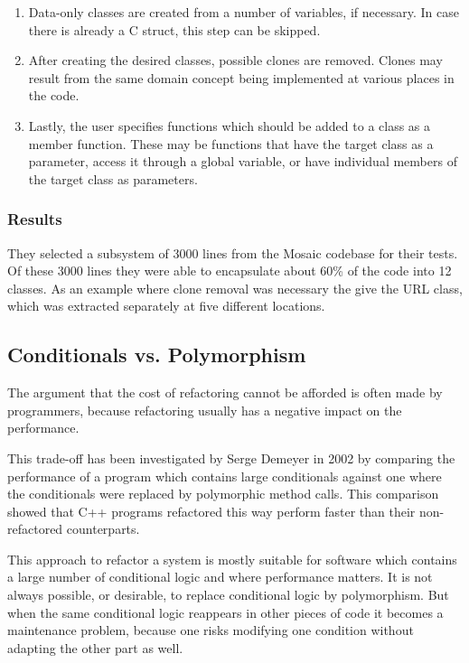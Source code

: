 \documentclass[conference,compsoc,a4paper]{IEEEtran}
\newcommand{\code}[1]{{\small\ttfamily #1}}
\begin{document}
\begin{enumerate}
  \item Data-only classes are created from a number of variables, if necessary. In case there is already a C 
  \code{struct}, this step can be skipped.
  
  \item After creating the desired classes, possible clones are removed. Clones may result from the same domain concept 
  being implemented at various places in the code.
  
  \item Lastly, the user specifies functions which should be added to a class as a member function. These may be 
  functions that have the target class as a parameter, access it through a global variable, or have individual members 
  of the target class as parameters.
\end{enumerate}

\subsubsection{Results}

They selected a subsystem of 3000 lines from the Mosaic codebase for their tests. Of these 3000 lines they were able to 
encapsulate about 60\% of the code into 12 classes. As an example where clone removal was necessary the give the URL 
class, which was extracted separately at five different locations.

\subsection{Conditionals vs. Polymorphism} \label{sec:polymorphism}

The argument that the cost of refactoring cannot be afforded is often made by programmers, because refactoring usually 
has a negative impact on the performance.

This trade-off has been investigated by Serge Demeyer in 2002 \cite{polymorphism} by comparing the performance of a 
program which contains large conditionals against one where the conditionals were replaced by polymorphic method calls. 
This comparison showed that C++ programs refactored this way perform faster than their non-refactored counterparts.

This approach to refactor a system is mostly suitable for software which contains a large number of conditional logic 
and where performance matters. It is not always possible, or desirable, to replace conditional logic by polymorphism. 
But when the same conditional logic reappears in other pieces of code it becomes a maintenance problem, because one 
risks modifying one condition without adapting the other part as well.
\end{document}
